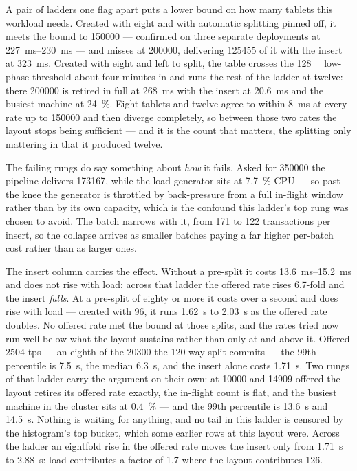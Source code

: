\documentclass[10pt,twocolumn]{article}
\begin{document}
A pair of ladders one flag apart puts a lower bound on how many tablets this workload needs. Created with
eight and with automatic splitting pinned off, it meets the bound to \num{150000} --- confirmed on three
separate deployments at \SIrange{227}{230}{\milli\second} --- and misses at \num{200000}, delivering
\num{125455} of it with the insert at \SI{323}{\milli\second}. Created with eight and left to split, the
table crosses the \SI{128}{\mebi\byte} low-phase threshold about four minutes in and runs the rest of the
ladder at twelve: there \num{200000} is retired in full at \SI{268}{\milli\second} with the insert at
\SI{20.6}{\milli\second} and the busiest machine at \SI{24}{\percent}. Eight tablets and twelve agree to
within \SI{8}{\milli\second} at every rate up to \num{150000} and then diverge completely, so between
those two rates the layout stops being sufficient --- and it is the count that matters, the splitting only
mattering in that it produced twelve.

The failing rungs do say something about \emph{how} it fails. Asked for \num{350000} the pipeline delivers
\num{173167}, while the load generator sits at \SI{7.7}{\percent} CPU --- so past the knee the generator is
throttled by back-pressure from a full in-flight window rather than by its own capacity, which is the
confound this ladder's top rung was chosen to avoid. The batch narrows with it, from \num{171} to
\num{122} transactions per insert, so the collapse arrives as smaller batches paying a far higher
per-batch cost rather than as larger ones.

The insert column carries the effect. Without a pre-split it costs \SIrange{13.6}{15.2}{\milli\second} and does
not rise with load: across that ladder the offered rate rises \num{6.7}-fold and the insert \emph{falls}. At a
pre-split of eighty or more it costs over a second and does rise with load --- created with \num{96}, it runs
\SI{1.62}{\second} to \SI{2.03}{\second} as the offered rate doubles. No offered rate met the bound at those
splits, and the rates tried now run well below what the layout sustains rather than only at and above it.
Offered \num{2504} tps --- an eighth of the \num{20300} the \num{120}-way split commits --- the 99th
percentile is \SI{7.5}{\second}, the median \SI{6.3}{\second}, and the insert alone costs
\SI{1.71}{\second}. Two rungs of that ladder carry the argument on their own: at \num{10000} and
\num{14909} offered the layout retires its offered rate exactly, the in-flight count is flat, and the
busiest machine in the cluster sits at \SI{0.4}{\percent} --- and the 99th percentile is
\SI{13.6}{\second} and \SI{14.5}{\second}. Nothing is waiting for anything, and no tail in this ladder
is censored by the histogram's top bucket, which some earlier rows at this layout were. Across the ladder
an eightfold rise in the offered rate moves the insert only from \SI{1.71}{\second} to
\SI{2.88}{\second}: load contributes a factor of \num{1.7} where the layout contributes \num{126}.
\end{document}
